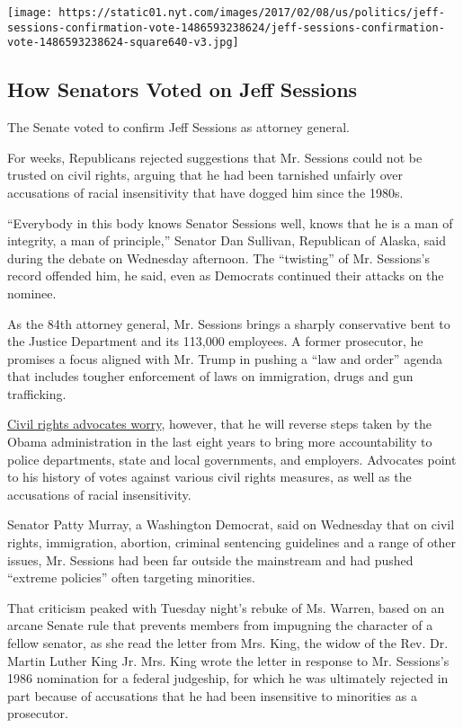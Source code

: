 \href{https://www.nytimes.com/interactive/2017/02/08/us/politics/jeff-sessions-confirmation-vote.html}{}

\texttt{[image: https://static01.nyt.com/images/2017/02/08/us/politics/jeff-sessions-confirmation-vote-1486593238624/jeff-sessions-confirmation-vote-1486593238624-square640-v3.jpg]}

\hypertarget{how-senators-voted-on-jeff-sessions}{%
\subsection{How Senators Voted on Jeff
Sessions}\label{how-senators-voted-on-jeff-sessions}}

The Senate voted to confirm Jeff Sessions as attorney general.

For weeks, Republicans rejected suggestions that Mr. Sessions could not
be trusted on civil rights, arguing that he had been tarnished unfairly
over accusations of racial insensitivity that have dogged him since the
1980s.

``Everybody in this body knows Senator Sessions well, knows that he is a
man of integrity, a man of principle,'' Senator Dan Sullivan, Republican
of Alaska, said during the debate on Wednesday afternoon. The
``twisting'' of Mr. Sessions's record offended him, he said, even as
Democrats continued their attacks on the nominee.

As the 84th attorney general, Mr. Sessions brings a sharply conservative
bent to the Justice Department and its 113,000 employees. A former
prosecutor, he promises a focus aligned with Mr. Trump in pushing a
``law and order'' agenda that includes tougher enforcement of laws on
immigration, drugs and gun trafficking.

\href{http://nyti.ms/2jq2IQn}{Civil rights advocates worry}, however,
that he will reverse steps taken by the Obama administration in the last
eight years to bring more accountability to police departments, state
and local governments, and employers. Advocates point to his history of
votes against various civil rights measures, as well as the accusations
of racial insensitivity.

Senator Patty Murray, a Washington Democrat, said on Wednesday that on
civil rights, immigration, abortion, criminal sentencing guidelines and
a range of other issues, Mr. Sessions had been far outside the
mainstream and had pushed ``extreme policies'' often targeting
minorities.

That criticism peaked with Tuesday night's rebuke of Ms. Warren, based
on an arcane Senate rule that prevents members from impugning the
character of a fellow senator, as she read the letter from Mrs. King,
the widow of the Rev. Dr. Martin Luther King Jr. Mrs. King wrote the
letter in response to Mr. Sessions's 1986 nomination for a federal
judgeship, for which he was ultimately rejected in part because of
accusations that he had been insensitive to minorities as a prosecutor.

